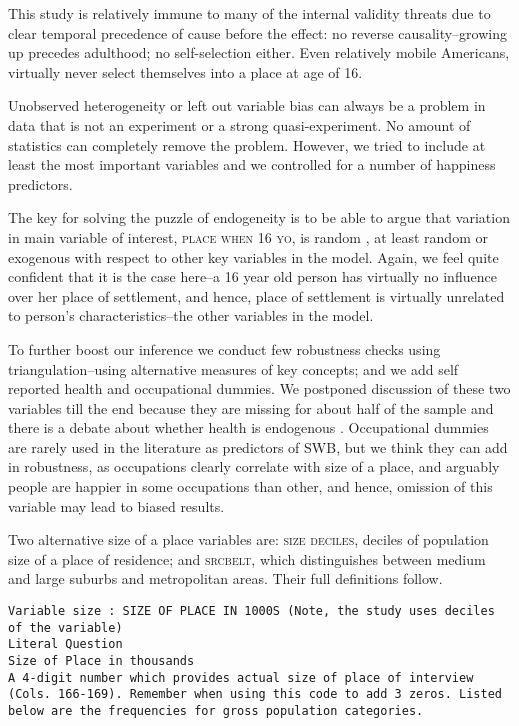 \documentclass[10pt, letterpaper]{article}
\begin{document}
\begin{spacing}{2.0}
This study is relatively immune to many of the internal validity threats due to
clear temporal precedence of cause before the effect:
no reverse causality--growing up precedes adulthood; no self-selection either.
%
Even relatively mobile Americans,  virtually never select themselves into a
place at age of 16.  

Unobserved heterogeneity or left out variable bias can always be a problem in
data that is not an experiment or a strong quasi-experiment. No amount of
statistics can completely remove the problem. However, we tried to include at
least the most important variables and we controlled for a number of happiness
predictors. 

The key for solving the puzzle of endogeneity is to be able to argue that
variation in main variable of interest, \textsc{place when 16 yo}, is random \citep{sorensen12}, at
least random or exogenous with respect to other key variables in the
model. Again, we feel quite confident that it is the case here--a 16 year old
person has virtually no influence over her place of settlement, and hence, place
of settlement is virtually unrelated to person's characteristics--the other
variables in the model.

To further boost our inference we conduct few robustness checks using
triangulation--using alternative measures of key concepts; and we add self
reported health and occupational dummies. We postponed discussion of these two
variables till the end because they are missing for about half of the sample and
there is a debate about whether health is endogenous
\citep{diener17,diener15,liu16}. Occupational dummies are rarely used in the
literature as predictors of SWB, but we think they can add in robustness, as
occupations clearly correlate with size of a place, and arguably people are
happier in some occupations than other, and hence, omission of this variable may
lead to biased results.  

Two alternative size of a place variables are: \textsc{size deciles}, 
 deciles of population size of a place of residence; and  \textsc{srcbelt},
 which distinguishes between medium and large suburbs and metropolitan
 areas. Their full definitions follow.

{\scriptsize
\begin{verbatim}
Variable size : SIZE OF PLACE IN 1000S (Note, the study uses deciles of the variable)
Literal Question
Size of Place in thousands
A 4-digit number which provides actual size of place of interview
(Cols. 166-169). Remember when using this code to add 3 zeros. Listed
below are the frequencies for gross population categories.


\end{verbatim}}
\end{spacing}
\end{document}
